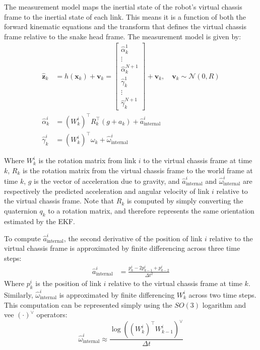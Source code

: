 \documentclass[letterpaper, 10 pt, conference]{ieeeconf}  %
\begin{document}
The measurement model maps the inertial state of the robot's virtual chassis frame to the inertial state of each link. This means it is a function of both the forward kinematic equations and the transform that defines the virtual chassis frame relative to the snake head frame. The measurement model is given by:
\begin{align}
    \hat{\mathbf{z}}_k &= h(\mathbf{x}_k) + \mathbf{v}_k = \begin{bmatrix}
        \hat{\alpha}_k^1 \\ \vdots \\ \hat{\alpha}_k^{N+1} \\ \hat{\gamma}_k^1 \\ \vdots \\ \hat{\gamma}_k^{N+1}
    \end{bmatrix} + \mathbf{v}_k, \quad \mathbf{v}_k \sim \mathcal{N}(0, R) \\
    \hat{\alpha}_k^i &= (W_k^i)^\top R_k^\top (g + a_k) + \hat{a}_{\text{internal}}^i \\
    \hat{\gamma}_k^i &= (W_k^i)^\top \omega_k + \hat{\omega}_{\text{internal}}^i
\end{align}

Where $W_k^i$ is the rotation matrix from link $i$ to the virtual chassis frame at time $k$, $R_k$ is the rotation matrix from the virtual chassis frame to the world frame at time $k$, $g$ is the vector of acceleration due to gravity, and $\hat{a}_{\text{internal}}^i$ and $\hat{\omega}_{\text{internal}}^i$ are respectively the predicted acceleration and angular velocity of link $i$ relative to the virtual chassis frame. Note that $R_k$ is computed by simply converting the quaternion $q_k$ to a rotation matrix, and therefore represents the same orientation estimated by the EKF.

To compute $\hat{a}_{\text{internal}}^i$, the second derivative of the position of link $i$ relative to the virtual chassis frame is approximated by finite differencing across three time steps:
\begin{align}
    \hat{a}_{\text{internal}}^i &= \frac{p_k^i - 2p_{k-1}^i + p_{k-2}^i}{\Delta t^2}
\end{align}
Where $p_k^i$ is the position of link $i$ relative to the virtual chassis frame at time $k$. Similarly, $\hat{\omega}_{\text{internal}}^i$ is approximated by finite differencing $W_k^i$ across two time steps. This computation can be represented simply using the $SO(3)$ logarithm and vee $(\cdot)^\vee$ operators:
\begin{equation}
    \hat{\omega}_{\text{internal}}^i \approx \frac{\log\left((W_k^i)^\top W_{k-1}^i\right)^\vee}{\Delta t}
\end{equation}
\end{document}
